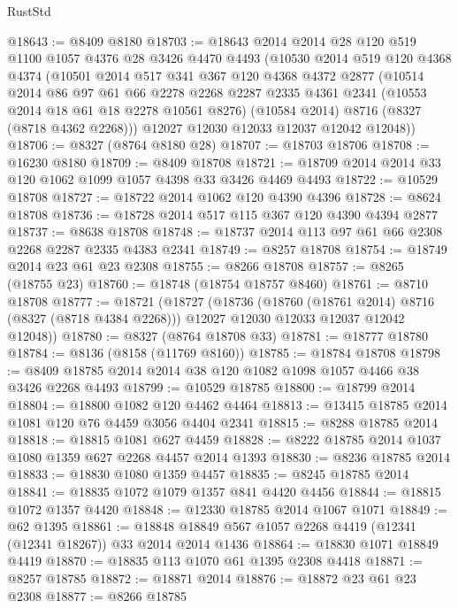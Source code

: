 \begin{lexlean}{RustStd}
\begin{coremodule}
@18643 := @8409 @8180
@18703 := @18643
    @2014
    @2014
    @28
    @120
    @519
    @1100
    @1057
    @4376
    @28
    @3426
    @4470
    @4493
    (@10530
      @2014
      @519
      @120
      @4368
      @4374
      (@10501
        @2014
        @517
        @341
        @367
        @120
        @4368
        @4372
        @2877
        (@10514
          @2014
          @86
          @97
          @61
          @66
          @2278
          @2268
          @2287
          @2335
          @4361
          @2341
          (@10553 @2014 @18 @61 @18 @2278 @10561 @8276)
          (@10584 @2014)
          @8716
          (@8327 (@8718 @4362 @2268)))
        @12027
        @12030
        @12033
        @12037
        @12042
        @12048))
@18706 := @8327 (@8764 @8180 @28)
@18707 := @18703 @18706
@18708 := @16230 @8180
@18709 := @8409 @18708
@18721 := @18709 @2014 @2014 @33 @120 @1062 @1099 @1057 @4398 @33 @3426 @4469 @4493
@18722 := @10529 @18708
@18727 := @18722 @2014 @1062 @120 @4390 @4396
@18728 := @8624 @18708
@18736 := @18728 @2014 @517 @115 @367 @120 @4390 @4394 @2877
@18737 := @8638 @18708
@18748 := @18737 @2014 @113 @97 @61 @66 @2308 @2268 @2287 @2335 @4383 @2341
@18749 := @8257 @18708
@18754 := @18749 @2014 @23 @61 @23 @2308
@18755 := @8266 @18708
@18757 := @8265 (@18755 @23)
@18760 := @18748 (@18754 @18757 @8460)
@18761 := @8710 @18708
@18777 := @18721
    (@18727
      (@18736
        (@18760 (@18761 @2014) @8716 (@8327 (@8718 @4384 @2268)))
        @12027
        @12030
        @12033
        @12037
        @12042
        @12048))
@18780 := @8327 (@8764 @18708 @33)
@18781 := @18777 @18780
@18784 := @8136 (@8158 (@11769 @8160))
@18785 := @18784 @18708
@18798 := @8409 @18785 @2014 @2014 @38 @120 @1082 @1098 @1057 @4466 @38 @3426 @2268 @4493
@18799 := @10529 @18785
@18800 := @18799 @2014
@18804 := @18800 @1082 @120 @4462 @4464
@18813 := @13415 @18785 @2014 @1081 @120 @76 @4459 @3056 @4404 @2341
@18815 := @8288 @18785 @2014
@18818 := @18815 @1081 @627 @4459
@18828 := @8222 @18785 @2014 @1037 @1080 @1359 @627 @2268 @4457 @2014 @1393
@18830 := @8236 @18785 @2014
@18833 := @18830 @1080 @1359 @4457
@18835 := @8245 @18785 @2014
@18841 := @18835 @1072 @1079 @1357 @841 @4420 @4456
@18844 := @18815 @1072 @1357 @4420
@18848 := @12330 @18785 @2014 @1067 @1071
@18849 := @62 @1395
@18861 := @18848 @18849 @567 @1057 @2268 @4419 (@12341 (@12341 @18267)) @33 @2014 @2014 @1436
@18864 := @18830 @1071 @18849 @4419
@18870 := @18835 @113 @1070 @61 @1395 @2308 @4418
@18871 := @8257 @18785
@18872 := @18871 @2014
@18876 := @18872 @23 @61 @23 @2308
@18877 := @8266 @18785

\end{coremodule}
\end{lexlean}
